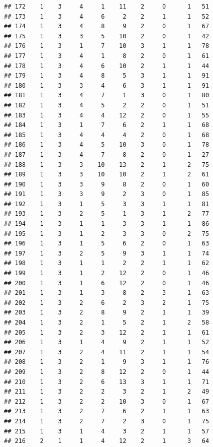 \documentclass[krantz2]{krantz}\usepackage{knitr}%
\begin{document}
\begin{knitrout}
\begin{kframe}
\begin{verbatim}
## 172    1    3     4     1    11    2     0      1   51
## 173    1    3     4     6     2    2     1      1   52
## 174    1    3     4     8     9    2     0      1   67
## 175    1    3     3     5    10    2     0      1   42
## 176    1    3     1     7    10    3     1      1   78
## 177    1    3     4     1     8    2     0      1   61
## 178    1    3     4     6    10    2     1      1   44
## 179    1    3     4     8     5    3     1      1   91
## 180    1    3     3     4     6    3     1      1   91
## 181    1    3     4     7     1    3     0      1   80
## 182    1    3     4     5     2    2     0      1   51
## 183    1    3     4     4    12    2     0      1   55
## 184    1    3     1     7     6    2     1      1   68
## 185    1    3     4     4     4    2     0      1   68
## 186    1    3     4     5    10    3     0      1   78
## 187    1    3     4     7     8    2     0      1   27
## 188    1    3     3    10    13    2     1      2   75
## 189    1    3     3    10    10    2     1      2   61
## 190    1    3     3     9     8    2     0      1   60
## 191    1    3     3     9     2    3     0      1   85
## 192    1    3     1     5     3    3     1      1   81
## 193    1    3     2     5     1    3     1      2   77
## 194    1    3     1     1     3    3     1      1   86
## 195    1    3     1     2     3    3     0      2   75
## 196    1    3     1     5     6    2     0      1   63
## 197    1    3     2     5     9    3     1      1   74
## 198    1    3     1     1     2    2     1      1   62
## 199    1    3     1     2    12    2     0      1   46
## 200    1    3     1     6    12    2     0      1   46
## 201    1    3     1     3     8    2     3      1   63
## 202    1    3     2     6     2    3     2      1   75
## 203    1    3     2     8     9    2     1      1   39
## 204    1    3     2     1     5    2     1      2   58
## 205    1    3     2     3    12    2     1      1   61
## 206    1    3     1     4     9    2     1      1   52
## 207    1    3     2     4    11    2     1      1   54
## 208    1    3     2     1     9    3     1      1   76
## 209    1    3     2     8    12    2     0      1   44
## 210    1    3     2     6    13    3     1      1   71
## 211    1    3     2     2     3    2     1      2   49
## 212    1    3     2     2    10    3     0      1   67
## 213    1    3     2     7     6    2     1      1   63
## 214    1    3     2     7     2    3     0      1   75
## 215    1    3     1     4     3    2     1      1   57
## 216    2    1     1     4    12    2     1      3   64

\end{verbatim}
\end{kframe}
\end{knitrout}
\end{document}
